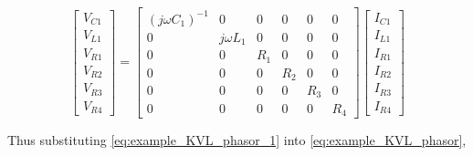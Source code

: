 \begin{example}
\begin{equation} %
	\left[\begin{array}{c}
		V_{C1} \\[3mm] V_{L1} \\[3mm] V_{R1} \\[3mm] V_{R2} \\[3mm] V_{R3} \\[3mm] V_{R4}
	\end{array}\right] =
%
	\left[\begin{array}{ccccccc}
	\left(j\omega C_1\right)^{-1} &  0           &  0   & 0   & 0   & 0   \\[3mm]
	                            0 &  j\omega L_1 &  0   & 0   & 0   & 0   \\[3mm]
	                            0 &  0           &  R_1 & 0   & 0   & 0   \\[3mm]
	                            0 &  0           &  0   & R_2 & 0   & 0   \\[3mm]
	                            0 &  0           &  0   & 0   & R_3 & 0   \\[3mm]
	                            0 &  0           &  0   & 0   & 0   & R_4
	\end{array}\right]
%
	\left[\begin{array}{c}
		I_{C1} \\[3mm] I_{L1} \\[3mm] I_{R1} \\[3mm] I_{R2} \\[3mm] I_{R3} \\[3mm] I_{R4}
	\end{array}\right] \label{eq:example_KVL_phasor_1}
\end{equation} %

	Thus substituting \eqref{eq:example_KVL_phasor_1} into \eqref{eq:example_KVL_phasor},


\end{example}
